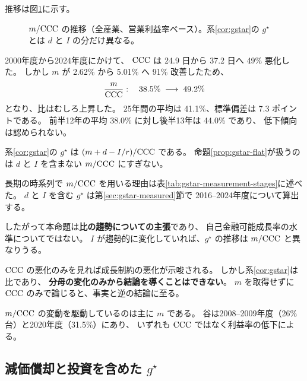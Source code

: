 推移は図\ref{fig:gstar-trend}に示す。

\begin{figure}[htbp]
\centering
{}
\caption{$m/\mathrm{CCC}$ の推移（全産業、営業利益率ベース）。系\ref{cor:gstar}の $g^\star$ とは $d$ と $I$ の分だけ異なる。}
\label{fig:gstar-trend}
\end{figure}

\begin{proposition}
\label{prop:gstar-flat}
2000年度から2024年度にかけて、
$\mathrm{CCC}$ は 24.9 日から 37.2 日へ 49\% 悪化した。
しかし $m$ が 2.62\% から 5.01\% へ 91\% 改善したため、
\[
\frac{m}{\mathrm{CCC}} : \quad 38.5\% \;\longrightarrow\; 49.2\%
\]
となり、比はむしろ上昇した。
25年間の平均は 41.1\%、標準偏差は 7.3 ポイントである。
前半12年の平均 38.0\% に対し後半13年は 44.0\% であり、
低下傾向は認められない。
\end{proposition}

\begin{remark}
\label{rem:gstar-flat-caveat}
系\ref{cor:gstar}の $g^\star$ は $(m+d-I/r)/\mathrm{CCC}$ である。
命題\ref{prop:gstar-flat}が扱うのは $d$ と $I$ を含まない $m/\mathrm{CCC}$ にすぎない。

長期の時系列で $m/\mathrm{CCC}$ を用いる理由は表\ref{tab:gstar-measurement-stages}に述べた。
$d$ と $I$ を含む $g^\star$ は第\ref{sec:gstar-measured}節で
2016--2024年度について算出する。

したがって本命題は\textbf{比の趨勢についての主張}であり、
自己金融可能成長率の水準についてではない。
$I$ が趨勢的に変化していれば、$g^\star$ の推移は $m/\mathrm{CCC}$ と異なりうる。
\end{remark}

\begin{remark}[分子と分母を分けて測る必要]
$\mathrm{CCC}$ の悪化のみを見れば成長制約の悪化が示唆される。
しかし系\ref{cor:gstar}は比であり、
\textbf{分母の変化のみから結論を導くことはできない}。
$m$ を取得せずに $\mathrm{CCC}$ のみで論じると、事実と逆の結論に至る。

$m/\mathrm{CCC}$ の変動を駆動しているのは主に $m$ である。
谷は2008--2009年度（26\%台）と2020年度（31.5\%）にあり、
いずれも $\mathrm{CCC}$ ではなく利益率の低下による。
\end{remark}

\subsection{減価償却と投資を含めた \texorpdfstring{$g^\star$}{g*}}

